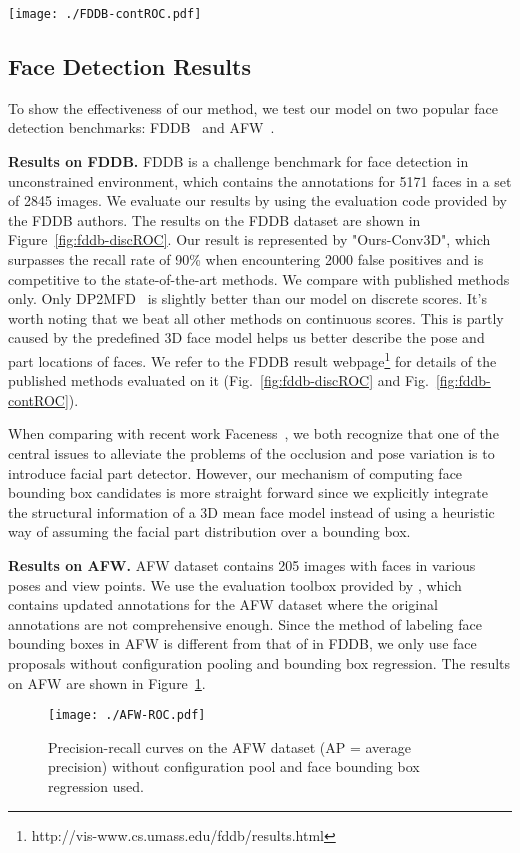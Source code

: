 \documentclass[runningheads]{llncs}
\begin{document}
\begin{figure*}[h!]
	\centering
	\texttt{[image: ./FDDB-contROC.pdf]}
	\caption{FDDB results based on continuous scores using face ellipses in evaluation. The recall rates are computed against 2000 false positives.}\label{fig:fddb-contROC}
\end{figure*}


\subsection{Face Detection Results}

To show the effectiveness of our method, we test our model on two popular face detection benchmarks: FDDB~\cite{FDDB} and AFW~\cite{AFW}.

\textbf{Results on FDDB.} FDDB is a challenge benchmark for face detection in unconstrained environment, which contains the annotations for 5171 faces in a set of 2845 images. We evaluate our results by using the evaluation code provided by the FDDB authors. The results on the FDDB dataset are shown in Figure~\ref{fig:fddb-discROC}. Our result is represented by "Ours-Conv3D", which surpasses the recall rate of 90\% when encountering 2000 false positives and is competitive to the state-of-the-art methods. We compare with published methods only. Only DP2MFD~\cite{DP2MFD} is slightly better than our model on discrete scores. It's worth noting that we beat all other methods on continuous scores. This is partly caused by the predefined 3D face model helps us better describe the pose and part locations of faces.  We refer to the FDDB result webpage\footnote{http://vis-www.cs.umass.edu/fddb/results.html} for details of the published methods evaluated on it (Fig.~\ref{fig:fddb-discROC} and Fig.~\ref{fig:fddb-contROC}).

When comparing with recent work Faceness~\cite{FacePart2Whole}, we both recognize that one of the central issues to alleviate the problems of the occlusion and pose variation is to introduce facial part detector. However, our mechanism of computing face bounding box candidates is more straight forward since we explicitly integrate the structural information of a 3D mean face model instead of using a heuristic way of assuming the facial part distribution over a bounding box. 

\textbf{Results on AFW.} AFW dataset contains 205 images with faces in various poses and view points. We use the evaluation toolbox provided by \cite{DPMFace}, which contains updated annotations for the AFW dataset where the original annotations are not comprehensive enough. Since the method of labeling face bounding boxes in AFW is different from that of in FDDB, we only use face proposals without configuration pooling and bounding box regression. The results on AFW  are shown in Figure~\ref{fig:afw-ROC}.
\begin{figure} [t]
\centering
\texttt{[image: ./AFW-ROC.pdf]}
\caption{Precision-recall curves on the AFW dataset (AP = average precision) without configuration pool and face bounding box regression used.}\label{fig:afw-ROC}
\end{figure}
\end{document}
